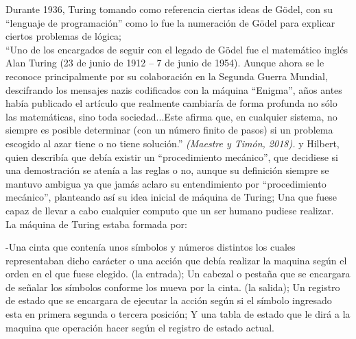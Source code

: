 \documentclass[12pt]{article}
\begin{document}
Durante 1936, Turing tomando como referencia ciertas ideas de Gödel, con su “lenguaje de programación” como lo fue la numeración de Gödel para explicar ciertos problemas de lógica; \\

“Uno de los encargados de seguir con el legado de Gödel fue el matemático inglés Alan Turing (23 de junio de 1912 – 7 de junio de 1954). Aunque ahora se le reconoce principalmente por su colaboración en la Segunda Guerra Mundial, descifrando los mensajes nazis codificados con la máquina “Enigma”, años antes había publicado el artículo que realmente cambiaría de forma profunda no sólo las matemáticas, sino toda sociedad...Este afirma que, en cualquier sistema, no siempre es posible determinar (con un número finito de pasos) si un problema escogido al azar tiene o no tiene solución.” \emph{(Maestre y Timón, 2018).}
y Hilbert, quien describía que debía existir un “procedimiento mecánico”, que decidiese si una demostración se atenía a las reglas o no, aunque su definición siempre se mantuvo ambigua ya que jamás aclaro su entendimiento por “procedimiento mecánico”, planteando así su idea inicial de máquina de Turing; Una que fuese capaz de llevar a cabo cualquier computo que un ser humano pudiese realizar.\\
La máquina de Turing estaba formada por: 


-Una cinta que contenía unos símbolos y números distintos los cuales representaban dicho carácter o una acción que debía realizar la maquina según el orden en el que fuese elegido. (la entrada); Un cabezal o pestaña que se encargara de señalar los símbolos conforme los mueva por la cinta. (la salida); Un registro de estado que se encargara de ejecutar la acción según si el símbolo ingresado esta en primera segunda o tercera posición; Y una tabla de estado que le dirá a la maquina que operación hacer según el registro de estado actual.\\
\end{document}
